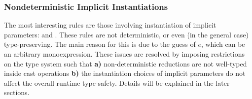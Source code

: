 \subsubsection{Nondeterministic Implicit Instantiations}
The most interesting rules are those involving instantiation of implicit parameters:
 and . These rules are not deterministic, or even
(in the general case) type-preserving. The main reason for this is due to the
guess of $e$, which can be an arbitrary monoexpression.
These issues are resolved by imposing restrictions on the type system such that
\textbf{a)} non-deterministic reductions are not well-typed inside cast operations
\textbf{b)} the instantiation choices of implicit parameters do not affect the
overall runtime type-safety. Details will be explained in the later sections.

